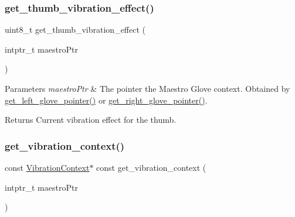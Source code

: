 \subsubsection{\texorpdfstring{get\+\_\+thumb\+\_\+vibration\+\_\+effect()}{get\_thumb\_vibration\_effect()}}
{\footnotesize\ttfamily uint8\+\_\+t get\+\_\+thumb\+\_\+vibration\+\_\+effect (\begin{DoxyParamCaption}\item[{intptr\+\_\+t}]{maestro\+Ptr }\end{DoxyParamCaption})}


\begin{DoxyParams}{Parameters}
{\em maestro\+Ptr} & The pointer the Maestro Glove context. Obtained by \hyperlink{group__glove_management_ga63ce3c99d4a8b8db851b22af9185764e}{get\+\_\+left\+\_\+glove\+\_\+pointer()} or \hyperlink{group__glove_management_ga9b8fd9d91aeac3f8da50f7a7eba0c32b}{get\+\_\+right\+\_\+glove\+\_\+pointer()}. \\
\hline
\end{DoxyParams}
\begin{DoxyReturn}{Returns}
Current vibration effect for the thumb. 
\end{DoxyReturn}
\mbox{\label{group__vibration_control_ga578e2f96e86827fd32c9e8e181cf4c64}} 
\subsubsection{\texorpdfstring{get\+\_\+vibration\+\_\+context()}{get\_vibration\_context()}}
{\footnotesize\ttfamily const \hyperlink{struct_vibration_context}{Vibration\+Context}$\ast$ const get\+\_\+vibration\+\_\+context (\begin{DoxyParamCaption}\item[{intptr\+\_\+t}]{maestro\+Ptr }\end{DoxyParamCaption})}


